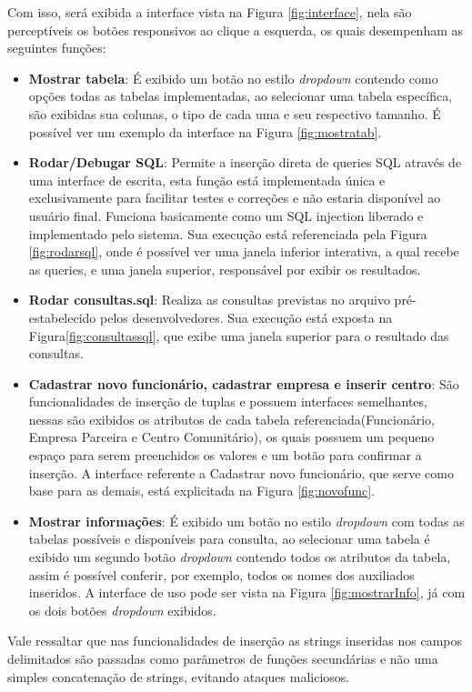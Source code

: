 Com isso, será exibida a interface vista na Figura \ref{fig:interface}, nela são perceptíveis os botões responsivos ao clique a esquerda, os quais desempenham as seguintes funções:
\begin{itemize}
    \item \textbf{Mostrar tabela}: É exibido um botão no estilo \textit{dropdown} contendo como opções todas as tabelas implementadas, ao selecionar uma tabela específica, são exibidas sua colunas, o tipo de cada uma e seu respectivo tamanho. É possível ver um exemplo da interface na Figura \ref{fig:mostratab}.
    \item \textbf{Rodar/Debugar SQL}: Permite a inserção direta de queries SQL através de uma interface de escrita, esta função está implementada única e exclusivamente para facilitar testes e correções e não estaria disponível ao usuário final. Funciona basicamente como um SQL injection liberado e implementado pelo sistema. Sua execução está referenciada pela Figura \ref{fig:rodarsql}, onde é possível ver uma janela inferior interativa, a qual recebe as queries, e uma janela superior, responsável por exibir os resultados.
    \item \textbf{Rodar consultas.sql}: Realiza as consultas previstas no arquivo pré-estabelecido pelos desenvolvedores. Sua execução está exposta na Figura\ref{fig:consultassql}, que exibe uma janela superior para o resultado das consultas.
    \item \textbf{Cadastrar novo funcionário, cadastrar empresa e inserir centro}: São funcionalidades de inserção de tuplas e possuem interfaces semelhantes, nessas são exibidos os atributos de cada tabela referenciada(Funcionário, Empresa Parceira e Centro Comunitário), os quais possuem um pequeno espaço para serem preenchidos os valores e um botão para confirmar a inserção. A interface referente a Cadastrar novo funcionário, que serve como base para as demais, está explicitada na Figura \ref{fig:novofunc}.
    \item \textbf{Mostrar informações}: É exibido um botão no estilo \textit{dropdown} com todas as tabelas possíveis e disponíveis para consulta, ao selecionar uma tabela é exibido um segundo botão \textit{dropdown} contendo todos os atributos da tabela, assim é possível conferir, por exemplo, todos os nomes dos auxiliados inseridos. A interface de uso pode ser vista na Figura \ref{fig:mostrarInfo}, já com os dois botões \textit{dropdown} exibidos.
\end{itemize}

Vale ressaltar que nas funcionalidades de inserção as strings inseridas nos campos delimitados são passadas como parâmetros de funções secundárias e não uma simples concatenação de strings, evitando ataques maliciosos.

